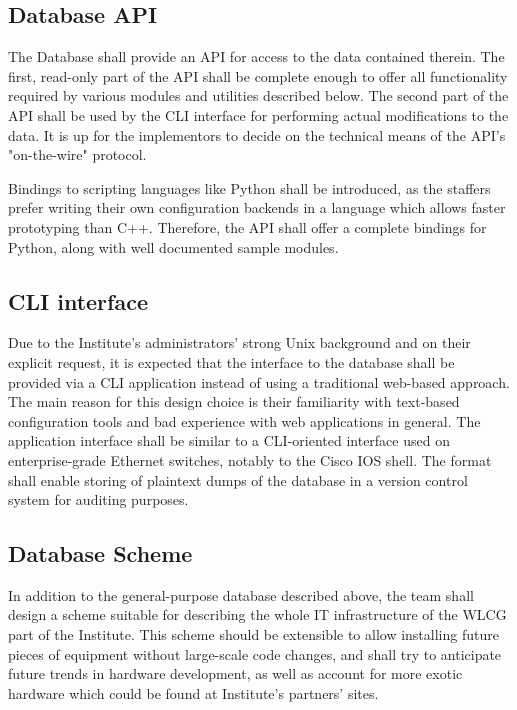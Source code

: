 \documentclass{article}
\begin{document}
\subsection{Database API}

The Database shall provide an API for access to the data contained therein. The first, read-only part of the API shall be complete
enough to offer all functionality required by various modules and utilities described below.  The second part of the API shall be
used by the CLI interface for performing actual modifications to the data.  It is up for the implementors to decide on the
technical means of the API's "on-the-wire" protocol.

Bindings to scripting languages like Python shall be introduced, as the staffers prefer writing their own configuration backends
in a language which allows faster prototyping than C++.  Therefore, the API shall offer a complete bindings for Python, along with
well documented sample modules.

\subsection{CLI interface}

Due to the Institute's administrators' strong Unix background and on their explicit request, it is expected that the interface to
the database shall be provided via a CLI application instead of using a traditional web-based approach.  The main reason for this
design choice is their familiarity with text-based configuration tools and bad experience with web applications in general.  The
application interface shall be similar to a CLI-oriented interface used on enterprise-grade Ethernet switches, notably to the
Cisco IOS shell.  The format shall enable storing of plaintext dumps of the database in a version control system for auditing
purposes.

\subsection{Database Scheme}

In addition to the general-purpose database described above, the team shall design a scheme suitable for describing the whole IT
infrastructure of the WLCG part of the Institute.  This scheme should be extensible to allow installing future pieces of equipment
without large-scale code changes, and shall try to anticipate future trends in hardware development, as well as account for more
exotic hardware which could be found at Institute's partners' sites.
\end{document}

